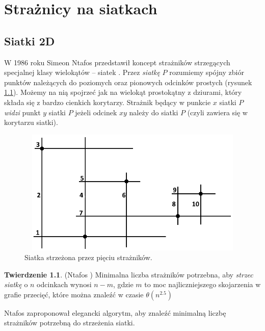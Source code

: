 \documentclass[brudnopis]{xmgr}
\theoremstyle{definition}
\newtheorem{Twierdzenie}{Twierdzenie}
\begin{document}
\chapter{Strażnicy na siatkach}
\section{Siatki 2D}
W 1986 roku Simeon Ntafos przedstawił koncept strażników strzegących specjalnej klasy wielokątów -- siatek \cite{ntafos}.
Przez \emph{siatkę} $P$ rozumiemy spójny zbiór punktów należących do poziomych oraz pionowych odcinków prostych (rysunek \ref{fig:siatka 2d}). Możemy na nią spojrzeć jak na wielokąt prostokątny z dziurami, który składa się z bardzo cienkich korytarzy.
Strażnik będący w punkcie $x$ siatki $P$ \emph{widzi} punkt $y$ siatki $P$ jeżeli odcinek $xy$ należy do siatki $P$ (czyli zawiera się w korytarzu siatki).
 \begin{figure}[ht!]
   \centering
   \includegraphics[width=14cm,height=6cm]{rysunki/przykladowa_siatka.png}
   \caption{Siatka strzeżona przez pięciu strażników.}
   \label{fig:siatka 2d}
 \end{figure} 

\begin{Twierdzenie} (Ntafos \cite{ntafos})
	Minimalna liczba strażników potrzebna, aby \emph{strzec siatkę} o $n$ odcinkach wynosi $n - m$, gdzie $m$ to moc najliczniejszego skojarzenia w grafie przecięć, które można znaleźć w czasie $\theta(n^{2.5})$
\end{Twierdzenie}

Ntafos zaproponował elegancki algorytm, aby znaleźć minimalną liczbę strażników potrzebną do strzeżenia siatki.
\end{document}
